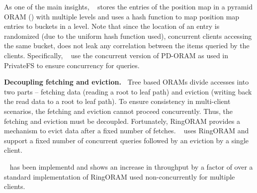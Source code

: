   As one of the main insights, \sysname~ stores the entries of the position map in a pyramid 
  ORAM (\cite{goldreich,privatefs}) with multiple levels and uses a hash function to map position map 
  entries to buckets in a level. 
  Note that since the location of an entry is randomized 
  (due to the uniform hash function used), concurrent clients 
  accessing the same bucket, does not leak any correlation between the items queried by the clients. Specifically, \sysname~ use the concurrent 
  version of PD-ORAM as used in PrivateFS \cite{privatefs} to ensure concurrency for queries.

  {\bf Decoupling fetching and eviction.~}
  Tree based ORAMs divide accesses into two parts -- fetching data (reading a root to leaf path) and eviction (writing back 
  the read data to a root to leaf path). To ensure consistency in multi-client scenarios, the fetching and eviction cannot proceed concurrently. 
  Thus, the 
  fetching and eviction must be decoupled. Fortunately, RingORAM \cite{ringoram} provides a 
  mechanism to evict data after a fixed number of fetches. 
  \sysname~ uses RingORAM and support a fixed number of concurrent queries followed
  by an eviction by a single client. 

  \sysname~ has been implementd and 
  shows an increase in throughput by a factor of  
  over a standard implementation of 
  RingORAM \cite{ringoram} used non-concurrently for multiple clients.  
